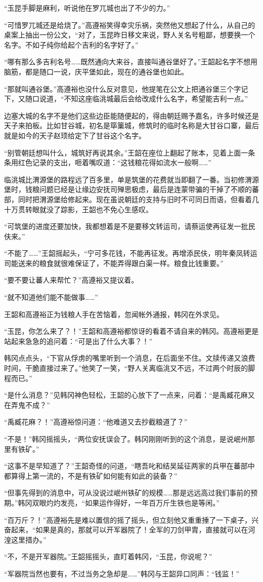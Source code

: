 “玉昆手脚是麻利，听说他在罗兀城也出了不少的力。”

“可惜罗兀城还是给烧了。”高遵裕笑得幸灾乐祸，突然他又想起了什么，从自己的桌案上抽出一份公文，“对了，玉昆昨日移文来说，野人关名号粗鄙，想要换一个名字。不如子纯你给起个吉利的名字好了。”

“哪有那么多吉利名号……既然通向大来谷，直接叫通谷堡好了。”王韶起名字不想用脑筋，都是随口一说，庆平堡如此，现在的通谷堡也如此。

“那就叫通谷堡。”高遵裕也没什么反对意见，他提笔在公文上把通谷堡三个字记下，又随口说道，“不知这座临洮城最后会给改成什么名字，希望能吉利一点。”

边塞大城的名字不是他们这些边臣能随便起的，得由朝廷赐予嘉名，许多时候还是天子来拍板。比如甘谷城，初名是筚篥城，修筑时的临时名称是大甘谷口寨，最后就是如今的天子赵顼给定下了甘谷这个名字。

“别管朝廷想叫什么，城筑好再说其余。”王韶在座位上翻起了账本，见着上面一条条用红色记录的支出，咂着嘴叹道：“这钱粮花得如流水一般啊……”

临洮城比渭源堡的路程远了百多里，单是筑堡的花费就当即翻了一番。当初修渭源堡时，钱粮问题已经是让缘边安抚司殚思极虑，最后是连蒙带骗的干掉了不顺的蕃部，同时把渭源堡给修起来。现在虽说朝廷的支持与旧时不可同日而语，但看着几十万贯转眼就没了踪影，王韶也不免心生感叹。

“可筑堡的进度还要加快，我都想着是不是要移文转运司，请蔡运使再征发一批民伕来。”

“不能了……”王韶摇起头，“宁可多花钱，不能再征发。再增添民伕，明年秦凤转运司能送来的粮食就很难保证了，不能弄得跟白渠一样。粮食比钱重要。”

“要不要让蕃人来帮忙？”高遵裕又提议着。

“就不知道他们能不能做事……”

王韶和高遵裕正为钱粮人手在苦恼着，忽闻帐外通报，韩冈在外求见。

“玉昆，你怎么来了？！”王韶和高遵裕都惊讶的看着不请自来的韩冈。高遵裕更是站起来急急的追问着：“可是出了什么大事？！”

韩冈点点头，“下官从俘虏的嘴里听到一个消息，在后面坐不住。文牍传递又浪费时间，干脆直接过来了。”他笑了一笑，“野人关离临洮又不远，不过两个时辰的脚程而已。”

“是什么消息？”见韩冈神色轻松，王韶的心放下了一点来，问着：“是禹臧花麻又在弄鬼不成？”

“禹臧花麻？！”高遵裕惊问道：“他难道又去抄截粮道了？”

“不是！”韩冈摇摇头，“两位安抚误会了。韩冈刚刚听到的这个消息，是说岷州那里有铁矿。”

“这事不是早知道了？”王韶奇怪的问道，“瞎吾叱和结吴延征两家的兵甲在蕃部中都算得上第一流的，不是有铁矿如何能有如此的装备？”

“但事先得到的消息中，可从没说过岷州铁矿的规模……那是远远高过我们事前的预期。”韩冈双眼灼灼发亮，“如果运作得好，一年百万斤生铁也是等闲。”

“百万斤？！”高遵裕先是难以置信的摇了摇头，但立刻他又重重捶了一下桌子，兴奋起来，“如果是真的，那就可以开军器院了！全军的刀剑甲胄，直接就可以在河湟这里措办。”

“不，不是开军器院。”王韶摇摇头，直盯着韩冈，“玉昆，你说呢？”

“军器院当然也要有，不过当务之急却是……”韩冈与王韶异口同声：“钱监！”

